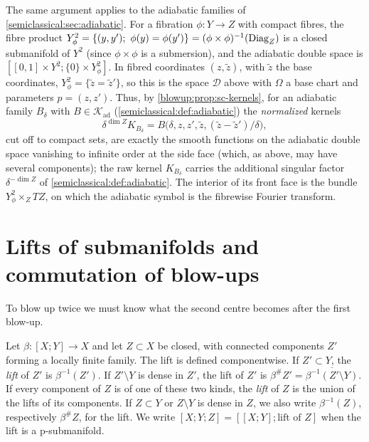 \begin{remark}\label{blowup:rem:adiabatic}
The same argument applies to the adiabatic families of \cref{semiclassical:sec:adiabatic}.
For a fibration $\phi:Y\to Z$ with compact fibres, the fibre product
$Y^2_\phi=\{(y,y');\ \phi(y)=\phi(y')\}=(\phi\times\phi)^{-1}(\Diag_Z)$ is a closed submanifold of
$Y^2$ (since $\phi\times\phi$ is a submersion), and the adiabatic double space is
$[[0,1]\times Y^2;\{0\}\times Y^2_\phi]$. In fibred coordinates $(z,\tilde z)$, with
$\tilde z$ the base coordinates, $Y^2_\phi=\{\tilde z=\tilde z'\}$, so this is the space
$\mathcal D$ above with $\Omega$ a base chart and parameters $p=(z,z')$. Thus, by
\cref{blowup:prop:sc-kernels}, for an adiabatic family $B_\delta$ with $B\in\mathcal K_{\mathrm{ad}}$
(\cref{semiclassical:def:adiabatic}) the \emph{normalized} kernels
\begin{equation*}
  \delta^{\dim Z}K_{B_\delta}=B\bigl(\delta,z,z',\tilde z,(\tilde z-\tilde z')/\delta\bigr),
\end{equation*}
cut off to compact sets, are exactly the smooth functions on the adiabatic double space
vanishing to infinite order at the side face (which, as above, may have several
components); the raw kernel $K_{B_\delta}$ carries the additional singular factor
$\delta^{-\dim Z}$ of \cref{semiclassical:def:adiabatic}. The interior of its front face is the bundle
$Y^2_\phi\times_ZTZ$, on which the adiabatic symbol is the fibrewise Fourier transform.
\end{remark}

\section{Lifts of submanifolds and commutation of blow-ups}\label{blowup:sec:commute}

To blow up twice we must know what the second centre becomes after the first blow-up.

\begin{definition}\label{blowup:def:lift}
Let $\beta:[X;Y]\to X$ and let $Z\subset X$ be closed, with connected components $Z'$
forming a locally finite family. The lift is defined componentwise. If $Z'\subset Y$, the
\emph{lift} of $Z'$ is $\beta^{-1}(Z')$. If $Z'\setminus Y$ is dense in $Z'$, the lift of
$Z'$ is $\beta^\#Z'=\overline{\beta^{-1}(Z'\setminus Y)}$. If every component of $Z$ is of
one of these two kinds, the \emph{lift} of $Z$ is the union of the lifts of its
components. If $Z\subset Y$ or $Z\setminus Y$ is dense in $Z$, we also write
$\beta^{-1}(Z)$, respectively $\beta^\#Z$, for the lift. We write
$[X;Y;Z]=[[X;Y];\text{lift of }Z]$ when the lift is a p-submanifold.
\end{definition}

